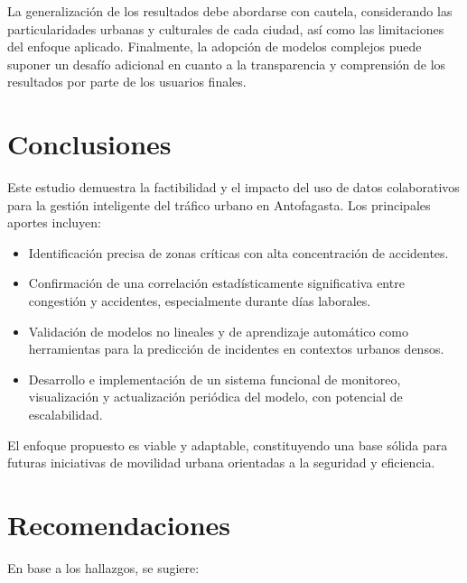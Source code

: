 \documentclass[12pt]{article}
\begin{document}
La generalización de los resultados debe abordarse con cautela, considerando las particularidades urbanas y culturales de cada ciudad, así como las limitaciones del enfoque aplicado. Finalmente, la adopción de modelos complejos puede suponer un desafío adicional en cuanto a la transparencia y comprensión de los resultados por parte de los usuarios finales.

\section{Conclusiones}

Este estudio demuestra la factibilidad y el impacto del uso de datos colaborativos para la gestión inteligente del tráfico urbano en Antofagasta. Los principales aportes incluyen:

\begin{itemize}
    \item Identificación precisa de zonas críticas con alta concentración de accidentes.
    \item Confirmación de una correlación estadísticamente significativa entre congestión y accidentes, especialmente durante días laborales.
    \item Validación de modelos no lineales y de aprendizaje automático como herramientas para la predicción de incidentes en contextos urbanos densos.
    \item Desarrollo e implementación de un sistema funcional de monitoreo, visualización y actualización periódica del modelo, con potencial de escalabilidad.
\end{itemize}

El enfoque propuesto es viable y adaptable, constituyendo una base sólida para futuras iniciativas de movilidad urbana orientadas a la seguridad y eficiencia.

\section{Recomendaciones}

En base a los hallazgos, se sugiere:
\end{document}
